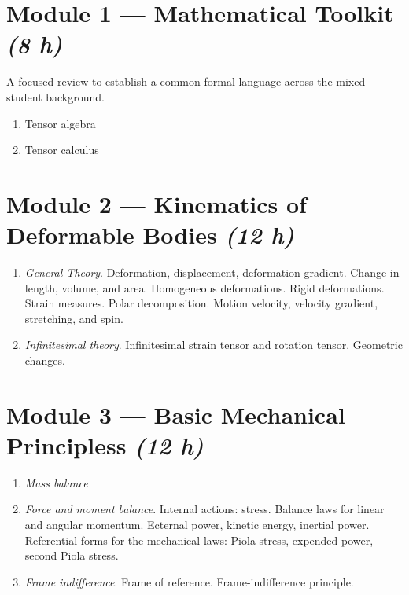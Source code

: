 \documentclass[11pt,a4paper]{scrartcl}
\begin{document}
	\section{Module 1 --- Mathematical Toolkit \normalfont\normalsize\itshape (8 h)}
	
	A focused review to establish a common formal language across the mixed student background.
	
	\begin{enumerate}[leftmargin=1.5em]
		\item Tensor algebra
		\item Tensor calculus
	\end{enumerate}
	
	\section{Module 2 --- Kinematics of Deformable Bodies \normalfont\normalsize\itshape (12 h)}
	\begin{enumerate}
		\item \textit{General Theory}. Deformation, displacement, deformation gradient. Change in  length, volume, and area. Homogeneous deformations. Rigid deformations. Strain measures. Polar decomposition.  Motion velocity, velocity gradient, stretching, and spin.
		\item  \textit{Infinitesimal theory}. Infinitesimal strain tensor and rotation tensor. Geometric changes.
	\end{enumerate}

	
	\section{Module 3 --- Basic Mechanical Principless \normalfont\normalsize\itshape (12 h)}
	\begin{enumerate}
		\item \textit{Mass balance}
		\item  \textit{Force and moment balance}.  Internal actions: stress. Balance laws for linear and angular momentum. Ecternal power, kinetic energy, inertial power. Referential forms for the mechanical laws: Piola stress, expended power, second Piola stress. 
		\item \textit{Frame indifference}. Frame of reference. Frame-indifference principle. 
	\end{enumerate}
\end{document}
